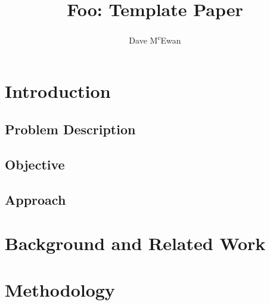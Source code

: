 \documentclass[a4paper]{article}
\newcommand{\doctitle}{Foo: Template Paper}
\begin{document}

\title{
  \doctitle
}

\author{
  Dave M\textsuperscript{c}Ewan
}

\maketitle

\begin{abstract}
\end{abstract}


\section{Introduction} %
\label{sec:introduction}

\subsection{Problem Description} %
\label{sec:problem}


\subsection{Objective} %
\label{sec:objective}


\subsection{Approach} %
\label{sec:approach}



\section{Background and Related Work} %
\label{sec:background}


\section{Methodology} %
\label{sec:methodology}
\end{document}
